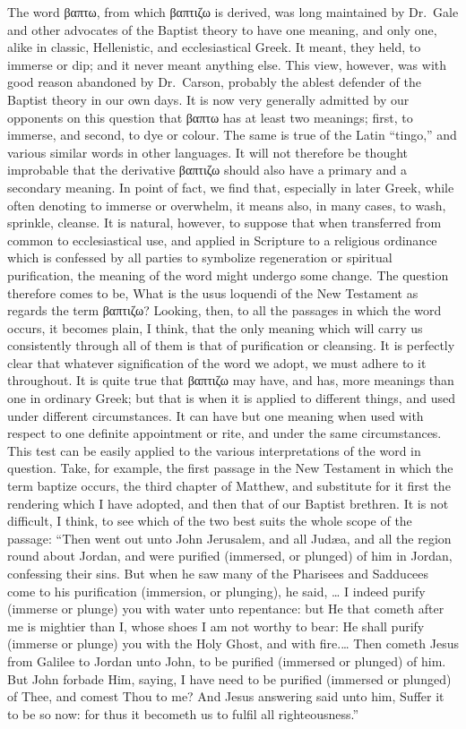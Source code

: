 \documentclass[]{book}
\begin{document}
The word βαπτω, from which βαπτιζω is derived, was long maintained by Dr.~Gale and other advocates of the Baptist theory to have one meaning, and only one, alike in classic, Hellenistic, and ecclesiastical Greek. It meant, they held, to immerse or dip; and it never meant anything else. This view, however, was with good reason abandoned by Dr.~Carson, probably the ablest defender of the Baptist theory in our own days. It is now very generally admitted by our opponents on this question that βαπτω has at least two meanings; first, to immerse, and second, to dye or colour. The same is true of the Latin ``tingo,'' and various similar words in other languages. It will not therefore be thought improbable that the derivative βαπτιζω should also have a primary and a secondary meaning. In point of fact, we find that, especially in later Greek, while often denoting to immerse or overwhelm, it means also, in many cases, to wash, sprinkle, cleanse. It is natural, however, to suppose that when transferred from common to ecclesiastical use, and applied in Scripture to a religious ordinance which is confessed by all parties to symbolize regeneration or spiritual purification, the meaning of the word might undergo some change. The question therefore comes to be, What is the usus loquendi of the New Testament as regards the term βαπτιζω? Looking, then, to all the passages in which the word occurs, it becomes plain, I think, that the only meaning which will carry us consistently through all of them is that of purification or cleansing. It is perfectly clear that whatever signification of the word we adopt, we must adhere to it throughout. It is quite true that βαπτιζω may have, and has, more meanings than one in ordinary Greek; but that is when it is applied to different things, and used under different circumstances. It can have but one meaning when used with respect to one definite appointment or rite, and under the same circumstances. This test can be easily applied to the various interpretations of the word in question. Take, for example, the first passage in the New Testament in which the term baptize occurs, the third chapter of Matthew, and substitute for it first the rendering which I have adopted, and then that of our Baptist brethren. It is not difficult, I think, to see which of the two best suits the whole scope of the passage: ``Then went out unto John Jerusalem, and all Judæa, and all the region round about Jordan, and were purified (immersed, or plunged) of him in Jordan, confessing their sins. But when he saw many of the Pharisees and Sadducees come to his purification (immersion, or plunging), he said, \ldots{} I indeed purify (immerse or plunge) you with water unto repentance: but He that cometh after me is mightier than I, whose shoes I am not worthy to bear: He shall purify (immerse or plunge) you with the Holy Ghost, and with fire.\ldots{} Then cometh Jesus from Galilee to Jordan unto John, to be purified (immersed or plunged) of him. But John forbade Him, saying, I have need to be purified (immersed or plunged) of Thee, and comest Thou to me? And Jesus answering said unto him, Suffer it to be so now: for thus it becometh us to fulfil all righteousness.''
\end{document}
